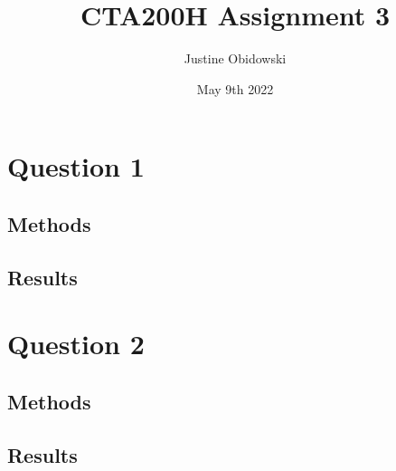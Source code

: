\documentclass{article}
\title{CTA200H Assignment 3}
\author{Justine Obidowski}
\date{May 9th 2022}
\begin{document}
\maketitle

\section{Question 1}
\subsection{Methods}
\subsection{Results}

\section{Question 2}
\subsection{Methods}
\subsection{Results}
\end{document}
